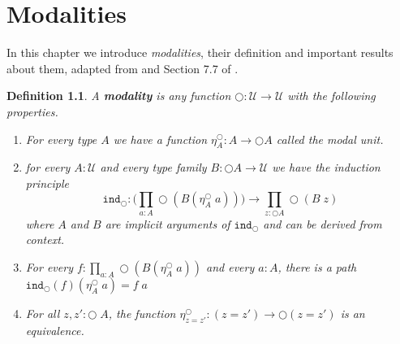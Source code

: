 \documentclass[12pt]{report}
\newtheorem{defn}[thm]{Definition}
\theoremstyle{definition}
\begin{document}
\chapter{Modalities}\label{ChapterModalities}
In this chapter we introduce \textit{modalities}, their definition and important results about them, adapted from \cite{1706.07526} and Section 7.7 of \cite{hottbook}. 
\begin{defn}\label{modality_definition}
A \textbf{modality} is any function $\bigcirc : \mathcal{U} \rightarrow \mathcal{U}$ with the following properties.
\begin{enumerate}
	\item For every type $A$ we have a function $\eta_A^\bigcirc : A \rightarrow \bigcirc A$ called the modal unit.
	\item for every $A : \mathcal{U}$ and every type family $B : \bigcirc A \rightarrow \mathcal{U}$ we have the induction principle
	$$\mathtt{ind}_\bigcirc : \Big( \prod_{a : A}\bigcirc (B (\eta_A^\bigcirc\; a)) \Big) \rightarrow \prod_{z : \bigcirc A} \bigcirc (B\; z)$$
	where $A$ and $B$ are implicit arguments of $\mathtt{ind}_\bigcirc$ and can be derived from context. 
	\item For every $f : \prod_{a : A} \bigcirc (B(\eta_A^\bigcirc\; a))$ and every $a : A$, there is a path $\mathtt{ind}_\bigcirc (f)(\eta_A^\bigcirc\; a) = f\; a$
	\item For all $z,z' : \bigcirc \; A$, the function $\eta_{z=z'}^\bigcirc : (z = z') \rightarrow \bigcirc (z = z')$ is an equivalence.
\end{enumerate}
\end{defn}
\end{document}
